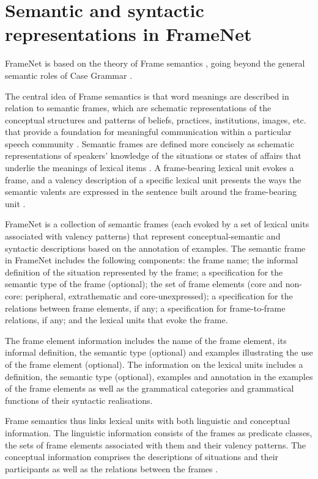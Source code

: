 \documentclass[output=paper,colorlinks,citecolor=brown]{langscibook}
\begin{document}
\section{Semantic and syntactic representations in FrameNet}
FrameNet is based on the theory of Frame semantics \citep{fillmore1982frame,fillmore1976frame,fillmore1976frame,fillmore1985frames,Fillmore+2006+373+400,Fillmore+2008,fillmore2010}, going beyond the general semantic roles of Case Grammar \citep{fillmore1968case}.

The central idea of Frame semantics is that word meanings are described in relation to semantic frames, which are schematic representations of the conceptual structures and patterns of beliefs, practices, institutions, images, etc. that provide a foundation for meaningful communication within a particular speech community \citep[235]{Fillmore2003}. Semantic frames are defined more concisely as schematic representations of speakers' knowledge of the situations or states of affairs that underlie the meanings of lexical items \citep[130]{fillmore2007valency}. A frame-bearing lexical unit evokes a frame, and a valency description of a specific lexical unit presents the ways the semantic valents are expressed in the sentence built around the frame-bearing unit \citep[131]{fillmore2007valency}. 

FrameNet is a collection of semantic frames (each evoked by a set of lexical units associated with valency patterns) that represent conceptual-semantic and syntactic descriptions based on the annotation of examples. The semantic frame in FrameNet includes the following components: the frame name; the informal definition of the situation represented by the frame; a specification for the semantic type of the frame (optional); the set of frame elements (core and non-core: peripheral, extrathematic and core-unexpressed); a specification for the relations between frame elements, if any; a specification for frame-to-frame relations, if any; and the lexical units that evoke the frame. 

The frame element information includes the name of the frame element, its informal definition, the semantic type (optional) and examples illustrating the use of the frame element (optional). The information on the lexical units includes a definition, the semantic type (optional), examples and annotation in the examples of the frame elements as well as the grammatical categories and grammatical functions of their syntactic realisations.

Frame semantics thus links lexical units with both linguistic and conceptual information. The linguistic information consists of the frames as predicate classes, the sets of frame elements associated with them and their valency patterns. The conceptual information comprises the descriptions of situations and their participants as well as the relations between the frames \citep{sikos2018framenets}.
\end{document}
